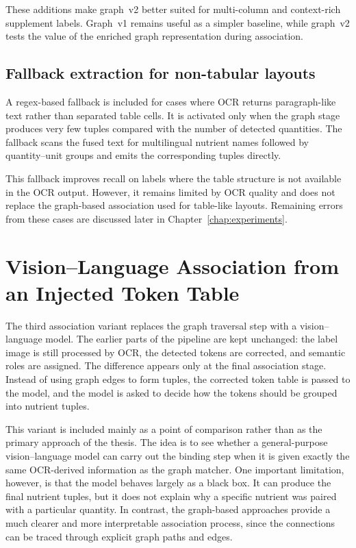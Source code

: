 These additions make graph~v2 better suited for multi-column and context-rich supplement labels. Graph~v1 remains useful as a simpler baseline, while graph~v2 tests the value of the enriched graph representation during association.

\subsection{Fallback extraction for non-tabular layouts}\label{sec:association-fallback}

A regex-based fallback is included for cases where OCR returns paragraph-like text rather than separated table cells. It is activated only when the graph stage produces very few tuples compared with the number of detected quantities. The fallback scans the fused text for multilingual nutrient names followed by quantity--unit groups and emits the corresponding tuples directly.

This fallback improves recall on labels where the table structure is not available in the OCR output. However, it remains limited by OCR quality and does not replace the graph-based association used for table-like layouts. Remaining errors from these cases are discussed later in Chapter~\ref{chap:experiments}.
\section{Vision--Language Association from an Injected Token Table}\label{sec:vlm-assoc}

The third association variant replaces the graph traversal step with a vision--language model. The earlier parts of the pipeline are kept unchanged: the label image is still processed by OCR, the detected tokens are corrected, and semantic roles are assigned. The difference appears only at the final association stage. Instead of using graph edges to form tuples, the corrected token table is passed to the model, and the model is asked to decide how the tokens should be grouped into nutrient tuples.

This variant is included mainly as a point of comparison rather than as the primary approach of the thesis. The idea is to see whether a general-purpose vision--language model can carry out the binding step when it is given exactly the same OCR-derived information as the graph matcher. One important limitation, however, is that the model behaves largely as a black box. It can produce the final nutrient tuples, but it does not explain why a specific nutrient was paired with a particular quantity. In contrast, the graph-based approaches provide a much clearer and more interpretable association process, since the connections can be traced through explicit graph paths and edges.

